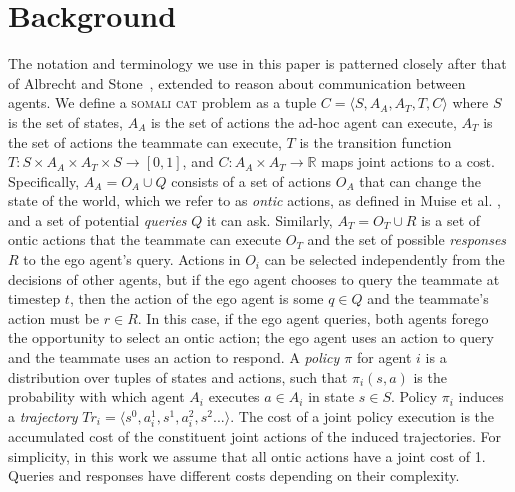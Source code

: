 \documentclass[letterpaper]{article}
\begin{document}
\section{Background}
The notation and terminology we use in this paper is patterned closely after that of Albrecht and Stone~, extended to reason about communication between agents. We define a \textsc{somali cat} problem as a tuple $C=\langle S, A_A, A_T, T, C \rangle$ where $S$ is the set of states, $A_A$ is the set of actions the ad-hoc agent can execute, $A_T$ is the set of actions the teammate can execute, $T$ is the transition function $T:S\times A_A \times A_T \times S \to [0,1]$, and $C: A_A \times A_T \rightarrow \mathbb{R}$ maps joint actions to a cost. Specifically, $A_A = O_A \cup Q$ consists of a set of actions $O_A$ that can change the state of the world, which we refer to as \emph{ontic} actions, as defined in Muise et al. , and a set of potential \emph{queries} $Q$ it can ask. Similarly, $A_T = O_T \cup R$ is a set of ontic actions that the teammate can execute $O_T$ and the set of possible \emph{responses} $R$ to the ego agent's query. 
 Actions in $O_i$ can be selected independently from the decisions of other agents, but if the ego agent chooses to query the teammate at timestep $t$, then the action of the ego agent is some $q \in Q$ and the teammate's action must be $r \in R$. In this case, if the ego agent queries, both agents forego the opportunity to select an ontic action; the ego agent uses an action to query and the teammate uses an action to respond.
A \emph{policy $\pi$} for agent $i$ is a distribution over tuples of states and actions, such that $\pi_{i}(s,a)$ is the probability with which agent $A_i$ executes $a \in A_i$ in state $s \in S$. 
Policy $\pi_i$ induces a \emph{trajectory} $Tr_i=\langle s^0, a_i^1, s^1, a_i^2, s^2... \rangle$.
The cost of a joint policy execution is the accumulated cost of the constituent joint actions of the induced trajectories. 
For simplicity, in this work we assume that all ontic actions have a joint cost of 1. Queries and responses have different costs depending on their complexity.
\end{document}

